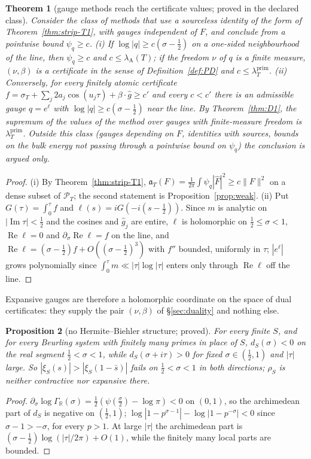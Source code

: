 \documentclass[11pt]{amsart}
\newtheorem{theorem}{Theorem}[section]
\newtheorem{proposition}[theorem]{Proposition}
\theoremstyle{definition}
\theoremstyle{remark}
\newcommand{\R}{\mathbb R}
\newcommand{\Rel}{\operatorname{Re}}
\newcommand{\Iml}{\operatorname{Im}}
\newcommand{\PT}{\mathcal P_T}
\newcommand{\lamP}{\lambda^{\mathrm{prim}}_T}
\newcommand{\lamA}{\lambda_{\mathrm A}(T)}
\newcommand{\sT}{\sigma_T}
\newcommand{\gh}[1]{\widehat g_{#1}}
\newcommand{\Fh}{\widehat F}
\begin{document}
\begin{theorem}[gauge methods reach the certificate values; proved in the declared class]\label{thm:strip-T4}
Consider the class of methods that use a sourceless identity of the form of Theorem~\ref{thm:strip-T1}, with gauges independent of
$F$, and conclude from a pointwise bound $\psi_q\ge c$.
\emph{(i)} If $\log|q|\ge c(\sigma-\frac12)$ on a one-sided neighbourhood of the line, then $\psi_q\ge c$ and $c\le\lamA$; if the
freedom $\nu$ of $q$ is a finite measure, $(\nu,\beta)$ is a certificate in the sense of Definition~\ref{def:PD} and $c\le\lamP$.
\emph{(ii)} Conversely, for every finitely atomic certificate $f=\sT+\sum_j2a_j\cos(u_j\tau)+\beta\cdot\widehat g\ge c'$ and every
$c<c'$ there is an admissible gauge $q=e^{\ell}$ with $\log|q|\ge c(\sigma-\frac12)$ near the line. By Theorem~\ref{thm:D1}, the
supremum of the values of the method over gauges with finite-measure freedom is $\lamP$.
Outside this class (gauges depending on $F$, identities with sources, bounds on the bulk energy not passing through a pointwise bound on
$\psi_q$) the conclusion is argued only.
\end{theorem}
\begin{proof}
(i) By Theorem~\ref{thm:strip-T1}, $\mathfrak a_T(F)=\frac1{2\pi}\int\psi_q|\Fh|^2\ge c\|F\|^2$ on a dense subset of $\PT$; the
second statement is Proposition~\ref{prop:weak}. (ii) Put $G(\tau)=\int_0^\tau f$ and $\ell(s)=iG(-i(s-\frac12))$. Since $m$ is
analytic on $|\Iml\tau|<\frac12$ and the cosines and $\gh j$ are entire, $\ell$ is holomorphic on $\frac12\le\sigma<1$, $\Rel\ell=0$
and $\partial_\sigma\Rel\ell=f$ on the line, and $\Rel\ell=(\sigma-\frac12)f+O((\sigma-\frac12)^3)$ with $f''$ bounded, uniformly in
$\tau$; $|e^{\ell}|$ grows polynomially since $\int_0^\tau m\ll|\tau|\log|\tau|$ enters only through $\Rel\ell$ off the line.
\end{proof}
Expansive gauges are therefore a holomorphic coordinate on the space of dual certificates: they supply the pair $(\nu,\beta)$ of
\S\ref{sec:duality} and nothing else.

\begin{proposition}[no Hermite--Biehler structure; proved]\label{prop:strip-R4}
For every finite $S$, and for every Beurling system with finitely many primes in place of $S$, $d_S(\sigma)<0$ on the real segment
$\frac12<\sigma<1$, while $d_S(\sigma+i\tau)>0$ for fixed $\sigma\in(\frac12,1)$ and $|\tau|$ large. So $|\xi_S(s)|>|\xi_S(1-\bar s)|$ fails
on $\frac12<\sigma<1$ in both directions; $\rho_S$ is neither contractive nor expansive there.
\end{proposition}
\begin{proof}
$\partial_\sigma\log\Gamma_\R(\sigma)=\frac12(\psi(\frac\sigma2)-\log\pi)<0$ on $(0,1)$, so the archimedean part of $d_S$ is negative on
$(\frac12,1)$; $\log|1-p^{\sigma-1}|-\log|1-p^{-\sigma}|<0$ since $\sigma-1>-\sigma$, for every $p>1$. At large $|\tau|$ the
archimedean part is $(\sigma-\frac12)\log(|\tau|/2\pi)+O(1)$, while the finitely many local parts are bounded.
\end{proof}
\end{document}
